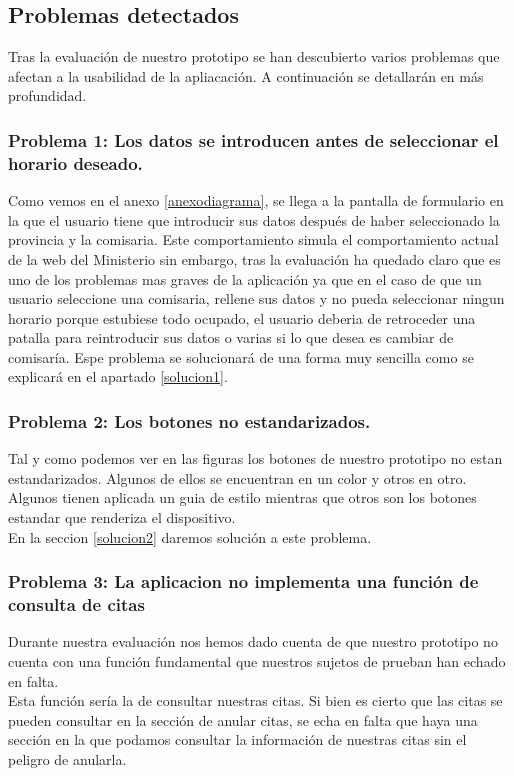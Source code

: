 \documentclass[a4paper,11pt]{article}
\begin{document}
\subsection{Problemas detectados}
Tras la evaluación de nuestro prototipo se han descubierto varios problemas que afectan a la usabilidad de la apliacación. A continuación se detallarán en más profundidad.
\subsubsection{Problema 1: Los datos se introducen antes de seleccionar el horario deseado.}
Como vemos en el anexo \ref{anexodiagrama}, se llega a la pantalla de formulario en la que el usuario tiene que introducir sus datos después de haber seleccionado la provincia y la comisaria. Este comportamiento simula el comportamiento actual de la web del Ministerio \cite{webcitaDNI} sin embargo, tras la evaluación ha quedado claro que es uno de los problemas mas graves de la aplicación ya que en el caso de que un usuario seleccione una comisaria, rellene sus datos y no pueda seleccionar ningun horario porque estubiese todo ocupado, el usuario deberia de retroceder una patalla para reintroducir sus datos o varias si lo que desea es cambiar de comisaría.
Espe problema se solucionará de una forma muy sencilla como se explicará en el apartado \ref{solucion1}.

\subsubsection{Problema 2: Los botones no estandarizados.}
Tal y como podemos ver en las figuras los botones de nuestro prototipo no estan estandarizados. Algunos de ellos se encuentran en un color y otros en otro. Algunos tienen aplicada un guia de estilo mientras que otros son los botones estandar que renderiza el dispositivo.\\
En la seccion \ref{solucion2} daremos solución a este problema.

\subsubsection{Problema 3: La aplicacion no implementa una función de consulta de citas}\label{consultacitas}
Durante nuestra evaluación nos hemos dado cuenta de que nuestro prototipo no cuenta con una función fundamental que nuestros sujetos de prueban han echado en falta.\\
Esta función sería la de consultar nuestras citas. Si bien es cierto que las citas se pueden consultar en la sección de anular citas, se echa en falta que haya una sección en la que podamos consultar la información de nuestras citas sin el peligro de anularla.
\end{document}
